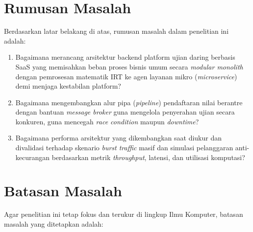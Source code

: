 \section{Rumusan Masalah}


Berdasarkan latar belakang di atas, rumusan masalah dalam penelitian ini adalah:

\begin{enumerate}
	\item Bagaimana merancang arsitektur backend platform ujian daring berbasis SaaS yang memisahkan beban proses bisnis umum secara \textit{modular monolith} dengan pemrosesan matematik IRT ke agen layanan mikro (\textit{microservice}) demi menjaga kestabilan platform?
  \item Bagaimana mengembangkan alur pipa (\textit{pipeline}) pendaftaran nilai berantre dengan bantuan \textit{message broker} guna mengelola penyerahan ujian secara konkuren, guna mencegah \textit{race condition} maupun \textit{downtime}?
	\item Bagaimana performa arsitektur yang dikembangkan saat diukur dan divalidasi terhadap skenario \textit{burst traffic} masif dan simulasi pelanggaran anti-kecurangan berdasarkan metrik \textit{throughput}, latensi, dan utilisasi komputasi?
\end{enumerate}

\section{Batasan Masalah}


Agar penelitian ini tetap fokus dan terukur di lingkup Ilmu Komputer, batasan masalah yang ditetapkan adalah:

